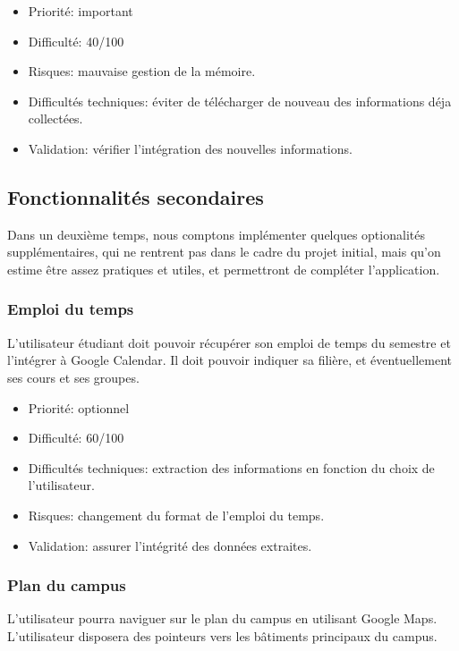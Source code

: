\documentclass [pdftex,12pt] {report}
\begin{document}
\begin{itemize}
\renewcommand{\labelitemi}{$\bullet$}
\item Priorité: important
\item Difficulté: 40/100
\item Risques: mauvaise gestion de la mémoire.
\item Difficultés techniques: éviter de télécharger de nouveau des informations déja collectées.
\item Validation: vérifier l'intégration des nouvelles informations.
\end{itemize}


\subsection{Fonctionnalités secondaires}
Dans un deuxième temps, nous comptons implémenter quelques optionalités supplémentaires, qui ne rentrent pas dans le cadre du projet initial, mais qu'on estime être assez pratiques et utiles, et permettront de compléter l'application.

\subsubsection{Emploi du temps}
L'utilisateur étudiant doit pouvoir récupérer son emploi de temps du semestre et l'intégrer à Google Calendar. Il doit pouvoir indiquer sa filière, et éventuellement ses cours et ses groupes. \\

\begin{itemize}
\renewcommand{\labelitemi}{$\bullet$}
\item Priorité: optionnel
\item Difficulté: 60/100
\item Difficultés techniques: extraction des informations en fonction du choix de l'utilisateur.
\item Risques: changement du format de l'emploi du temps.
\item Validation: assurer l'intégrité des données extraites.
\end{itemize}

\subsubsection{Plan du campus}
L'utilisateur pourra naviguer sur le plan du campus en utilisant Google Maps. L'utilisateur disposera des pointeurs vers les bâtiments principaux du campus. \\
\end{document}
